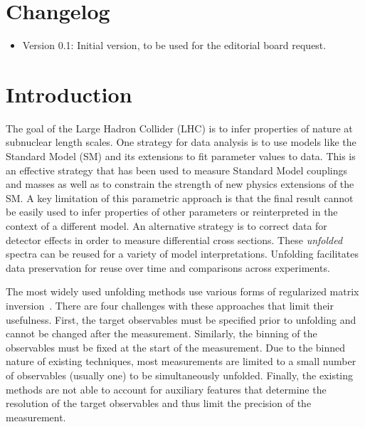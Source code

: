 \documentclass[NOTE, atlasdraft=true, texlive=2016, UKenglish]{\ATLASLATEXPATH atlasdoc}
\begin{document}

\clearpage

\section{Changelog}

\begin{itemize}
\item Version 0.1: Initial version, to be used for the editorial board request.
\end{itemize}

\clearpage

\section{Introduction}
\label{sec:intro}

The goal of the Large Hadron Collider (LHC) is to infer properties of nature at subnuclear length scales.   One strategy for data analysis is to use models like the Standard Model (SM) and its extensions to fit parameter values to data.  This is an effective strategy that has been used to measure Standard Model couplings and masses as well as to constrain the strength of new physics extensions of the SM.  A key limitation of this parametric approach is that the final result cannot be easily used to infer properties of other parameters or reinterpreted in the context of a different model.  An alternative strategy is to correct data for detector effects in order to measure differential cross sections.  These \textit{unfolded} spectra can be reused for a variety of model interpretations.   Unfolding facilitates data preservation for reuse over time and comparisons across experiments.

The most widely used unfolding methods use various forms of regularized matrix inversion~\cite{DAGOSTINI1995487,Hocker:1995kb,Schmitt:2012kp}.  There are four challenges with these approaches that limit their usefulness.   First, the target observables must be specified prior to unfolding and cannot be changed after the measurement.  Similarly, the binning of the observables must be fixed at the start of the measurement.  Due to the binned nature of existing techniques, most measurements are limited to a small number of observables (usually one) to be simultaneously unfolded.  Finally, the existing methods are not able to account for auxiliary features that determine the resolution of the target observables and thus limit the precision of the measurement.
\end{document}
